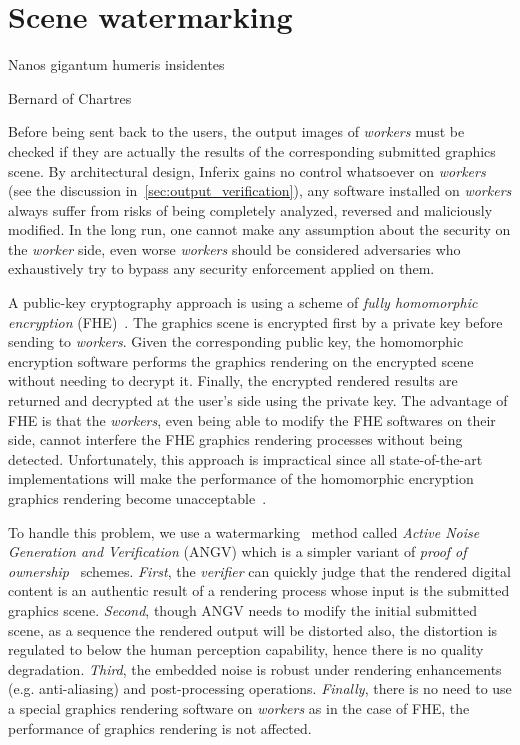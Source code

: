 \chapter{Scene watermarking}
\label{ch:scene_watermarking}
\epigraph{Nanos gigantum humeris insidentes}{Bernard of Chartres}

Before being sent back to the users, the output images of \emph{workers} must be checked if they are actually the results of the corresponding submitted graphics scene. By architectural design, Inferix gains no control whatsoever on \emph{workers} (see the discussion in~\autoref{sec:output_verification}), any software installed on \emph{workers} always suffer from risks of being completely analyzed, reversed and maliciously modified. In the long run, one cannot make any assumption about the security on the \emph{worker} side, even worse \emph{workers} should be considered adversaries who exhaustively try to bypass any security enforcement applied on them.

A public-key cryptography approach is using a scheme of \emph{fully homomorphic encryption} (FHE)~\cite{Gentry2009}. The graphics scene is encrypted first by a private key before sending to \emph{workers}. Given the corresponding public key, the homomorphic encryption software performs the graphics rendering on the encrypted scene without needing to decrypt it. Finally, the encrypted rendered results are returned and decrypted at the user's side using the private key. The advantage of FHE is that the \emph{workers}, even being able to modify the FHE softwares on their side, cannot interfere the FHE graphics rendering processes without being detected. Unfortunately, this approach is impractical since all state-of-the-art implementations will make the performance of the homomorphic encryption graphics rendering become unacceptable~\cite{9910347}.

To handle this problem, we use a watermarking~\cite{Cox1997,Cox1999} method called \emph{Active Noise Generation and Verification} (ANGV) which is a simpler variant of \emph{proof of ownership}~\cite{Craver1997} schemes. \emph{First}, the \emph{verifier} can quickly judge that the rendered digital content is an authentic result of a rendering process whose input is the submitted graphics scene. \emph{Second}, though ANGV needs to modify the initial submitted scene, as a sequence the rendered output will be distorted also, the distortion is regulated to below the human perception capability, hence there is no quality degradation. \emph{Third}, the embedded noise is robust under rendering enhancements (e.g. anti-aliasing) and post-processing operations. \emph{Finally}, there is no need to use a special graphics rendering software on \emph{workers} as in the case of FHE, the performance of graphics rendering is not affected.

